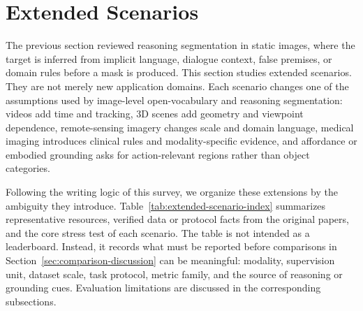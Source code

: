 \section{Extended Scenarios}
\label{sec:extended-scenarios}

The previous section reviewed reasoning segmentation in static images, where the target is inferred from implicit language, dialogue context, false premises, or domain rules before a mask is produced. This section studies extended scenarios. They are not merely new application domains. Each scenario changes one of the assumptions used by image-level open-vocabulary and reasoning segmentation: videos add time and tracking, 3D scenes add geometry and viewpoint dependence, remote-sensing imagery changes scale and domain language, medical imaging introduces clinical rules and modality-specific evidence, and affordance or embodied grounding asks for action-relevant regions rather than object categories.

Following the writing logic of this survey, we organize these extensions by the ambiguity they introduce. Table~\ref{tab:extended-scenario-index} summarizes representative resources, verified data or protocol facts from the original papers, and the core stress test of each scenario. The table is not intended as a leaderboard. Instead, it records what must be reported before comparisons in Section~\ref{sec:comparison-discussion} can be meaningful: modality, supervision unit, dataset scale, task protocol, metric family, and the source of reasoning or grounding cues. Evaluation limitations are discussed in the corresponding subsections.


